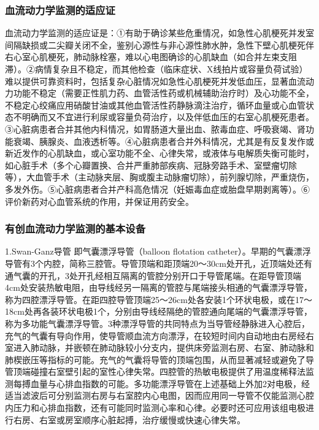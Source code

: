 \subsubsection{血流动力学监测的适应证}

血流动力学监测的适应证是：①有助于确诊某些危重情况，如急性心肌梗死并发室间隔缺损或二尖瓣关闭不全，鉴别心源性与非心源性肺水肿，急性下壁心肌梗死伴右心室心肌梗死，肺动脉栓塞，难以心电图确诊的心肌缺血（如合并左束支阻滞）。②病情复杂且不稳定，而其他检查（临床症状、X线拍片或容量负荷试验）难以提供可靠资料时，包括复杂心脏情况如急性心肌梗死并发低血压，显著血流动力功能不稳定（需要正性肌力药、血管活性药或机械辅助治疗时）及心功能不全，不稳定心绞痛应用硝酸甘油或其他血管活性药静脉滴注治疗，循环血量或心血管状态不明确而又不宜进行利尿或容量负荷治疗，以及伴低血压的右室心肌梗死患者。③心脏病患者合并其他内科情况，如胃肠道大量出血、脓毒血症、呼吸衰竭、肾功能衰竭、胰腺炎、血液透析等。④心脏病患者合并外科情况，尤其是有反复发作或新近发作的心肌缺血，或心室功能不全、心律失常，或液体与电解质失衡可能时，如心脏手术（多个心瓣置换、合并严重肺部疾病、冠脉旁路手术、室壁瘤切除等），大血管手术（主动脉夹层、胸或腹主动脉瘤切除），前列腺切除，严重烧伤，多发外伤。⑤心脏病患者合并产科高危情况（妊娠毒血症或胎盘早期剥离等）。⑥评价新药对心血管系统的作用，并保证用药安全。

\subsubsection{有创血流动力学监测的基本设备}

1.Swan-Ganz导管 即气囊漂浮导管（balloon flotation
catheter）。早期的气囊漂浮导管有3个内腔，简称三腔管。导管顶端和距顶端20～30cm处开孔，近顶端处还有通气囊的开孔，3处开孔经相互隔离的管腔分别开口于导管尾端。在距导管顶端4cm处安装热敏电阻，由导线经另一隔离的管腔与尾端接头相通的气囊漂浮导管，称为四腔漂浮导管。在距四腔导管顶端25～26cm处各安装1个环状电极，或在17～18cm处再各装环状电极1个，分别由导线经隔绝的管腔通向尾端的气囊漂浮导管，称为多功能气囊漂浮导管。3种漂浮导管的共同特点为当导管经静脉进入心腔后，充气的气囊有导向作用，使导管顺血流方向漂浮，在较短时间内自动地由右房经右室进入肺动脉，并嵌顿在肺动脉较小分支内，提供床旁监测右房、右室、肺动脉和肺楔嵌压等指标的可能。充气的气囊将导管的顶端包围，从而显著减轻或避免了导管顶端碰撞右室壁引起的室性心律失常。四腔管的热敏电极提供了用温度稀释法监测每搏血量与心排血指数的可能。多功能漂浮导管在上述基础上外加2对电极，经适当滤波后可分别监测右房与右室腔内心电图，因而应用同一导管不仅能监测心腔内压力和心排血指数，还有可能同时监测心率和心律。必要时还可应用该组电极进行右房、右室或房室顺序心脏起搏，治疗缓慢或快速心律失常。

